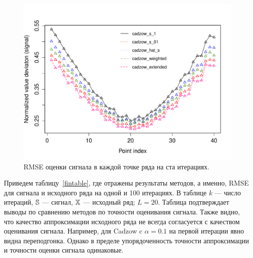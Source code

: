 \documentclass[12pt,a4paper,fleqn,leqno]{article}
\begin{document}

\begin{figure}[!hhh]
\begin{center}
\includegraphics[width = 13cm]{s1_it100.pdf}
\caption{RMSE оценки сигнала в каждой точке ряда на ста итерациях.}
\label{fig:s1_it100}
\end{center}
\end{figure}


Приведем таблицу~\ref{fintable}, где отражены результаты методов, а именно, RMSE для сигнала и исходного ряда на одной и 100 итерациях.
В таблице $k$ --- число итераций, $\mathbb{S}$ --- сигнал, $\mathbb{X}$ --- исходный ряд; $L=20$. Таблица подтверждает выводы по сравнению методов по точности
оценивания сигнала. Также видно, что качество аппроксимации исходного ряда не всегда согласуется с качеством оценивания сигнала.
Например, для Cadzow c $\alpha=0.1$ на первой итерации явно видна переподгонка. Однако в пределе упорядоченность точности аппроксимации
и точности оценки сигнала одинаковые.
\end{document}
